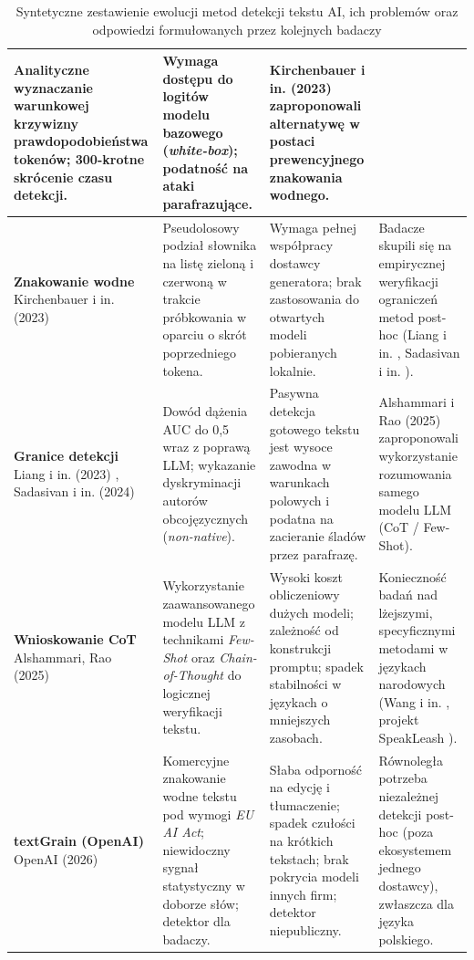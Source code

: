 \begin{table}[H]
\begin{tabularx}{\textwidth}{|p{2.6cm}|X|X|X|}
Analityczne wyznaczanie warunkowej krzywizny prawdopodobieństwa tokenów; 300-krotne skrócenie czasu detekcji. &
Wymaga dostępu do logitów modelu bazowego (\textit{white-box}); podatność na ataki parafrazujące. &
Kirchenbauer i in. (2023) \cite{kirchenbauer2023watermark} zaproponowali alternatywę w postaci prewencyjnego znakowania wodnego. \\
\hline
\textbf{Znakowanie wodne} \newline Kirchenbauer i in. (2023) \cite{kirchenbauer2023watermark} &
Pseudolosowy podział słownika na listę zieloną i czerwoną w trakcie próbkowania w oparciu o skrót poprzedniego tokena. &
Wymaga pełnej współpracy dostawcy generatora; brak zastosowania do otwartych modeli pobieranych lokalnie. &
Badacze skupili się na empirycznej weryfikacji ograniczeń metod post-hoc (Liang i in. \cite{liang2023gptdetectors}, Sadasivan i in. \cite{sadasivan2023can}). \\
\hline
\textbf{Granice detekcji} \newline Liang i in. (2023) \cite{liang2023gptdetectors}, Sadasivan i in. (2024) \cite{sadasivan2023can} &
Dowód dążenia AUC do 0,5 wraz z poprawą LLM; wykazanie dyskryminacji autorów obcojęzycznych (\textit{non-native}). &
Pasywna detekcja gotowego tekstu jest wysoce zawodna w warunkach polowych i podatna na zacieranie śladów przez parafrazę. &
Alshammari i Rao (2025) \cite{alshammari2025evaluating} zaproponowali wykorzystanie rozumowania samego modelu LLM (CoT / Few-Shot). \\
\hline
\textbf{Wnioskowanie CoT} \newline Alshammari, Rao (2025) \cite{alshammari2025evaluating} &
Wykorzystanie zaawansowanego modelu LLM z technikami \textit{Few-Shot} oraz \textit{Chain-of-Thought} do logicznej weryfikacji tekstu. &
Wysoki koszt obliczeniowy dużych modeli; zależność od konstrukcji promptu; spadek stabilności w językach o mniejszych zasobach. &
Konieczność badań nad lżejszymi, specyficznymi metodami w językach narodowych (Wang i in. \cite{wang2023m4}, projekt SpeakLeash \cite{speakleash2024}). \\
\hline
\textbf{textGrain (OpenAI)} \newline OpenAI (2026) \cite{openai2026textprovenance} &
Komercyjne znakowanie wodne tekstu pod wymogi \textit{EU AI Act}; niewidoczny sygnał statystyczny w doborze słów; detektor dla badaczy. &
Słaba odporność na edycję i tłumaczenie; spadek czułości na krótkich tekstach; brak pokrycia modeli innych firm; detektor niepubliczny. &
Równoległa potrzeba niezależnej detekcji post-hoc (poza ekosystemem jednego dostawcy), zwłaszcza dla języka polskiego. \\
\hline
\end{tabularx}
\caption{Syntetyczne zestawienie ewolucji metod detekcji tekstu AI, ich problemów oraz odpowiedzi formułowanych przez kolejnych badaczy}
\label{tab:ewolucja_problemow}
\end{table}



